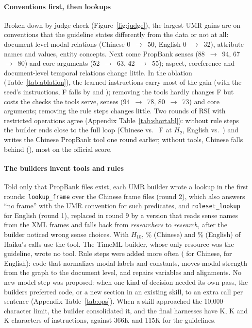 \paragraph{Conventions first, then lookups} Broken down by judge check (Figure~\ref{fig:judge}), the largest UMR gains are on conventions that the guideline states differently from the data or not at all: document-level modal relations (Chinese 0~$\rightarrow$~50, English 0~$\rightarrow$~32), attribute names and values, entity concepts. Next come PropBank senses (88~$\rightarrow$~94, 67~$\rightarrow$~80) and core arguments (52~$\rightarrow$~63, 42~$\rightarrow$~55); aspect, coreference and document-level temporal relations change little. In the ablation (Table~\ref{tab:ablation}), the learned instructions carry most of the gain (with the seed's instructions, F falls by \ablSeedSkillsZhDelta{} and \ablSeedSkillsEnDelta{}); removing the tools hardly changes F but costs the checks the tools serve, senses (94~$\rightarrow$~78, 80~$\rightarrow$~73) and core arguments; removing the rule steps changes little. Two rounds of RSI with restricted operations agree (Appendix Table~\ref{tab:shortabl}): without rule steps the builder ends close to the full loop (Chinese \sabNoRulesHTwoZh{} vs.\ \sabAllHTwoZh{} F at $H_2$, English \sabNoRulesHTwoEn{} vs.\ \sabAllHTwoEn{}) and writes the Chinese PropBank tool one round earlier; without tools, Chinese falls behind (\sabNoToolsHTwoZh{}), most on the official score.

\paragraph{The builders invent tools and rules} Told only that PropBank files exist, each UMR builder wrote a lookup in the first rounds: \texttt{lookup\_frame} over the Chinese frame files (round 2), which also answers ``no frame'' with the UMR convention for such predicates, and \texttt{roleset\_lookup} for English (round 1), replaced in round 9 by a version that reads sense names from the XML frames and falls back from \emph{researchers} to \emph{research}, after the builder noticed wrong sense choices. With $H_{10}$, \toolUseZh\% (Chinese) and \toolUseEn\% (English) of Haiku's calls use the tool. The TimeML builder, whose only resource was the guideline, wrote no tool. Rule steps were added more often (\stepsAppliedZh{} for Chinese, \stepsAppliedEn{} for English): code that normalizes modal labels and constants, moves modal strength from the graph to the document level, and repairs variables and alignments. No new model step was proposed: when one kind of decision needed its own pass, the builders preferred code, or a new section in an existing skill, to an extra call per sentence (Appendix Table~\ref{tab:ops}). When a skill approached the 10{,}000-character limit, the builder consolidated it, and the final harnesses have \sizeLastZh{}K, \sizeLastEn{}K and \sizeLastTml{}K characters of instructions, against 366K and 115K for the guidelines.

